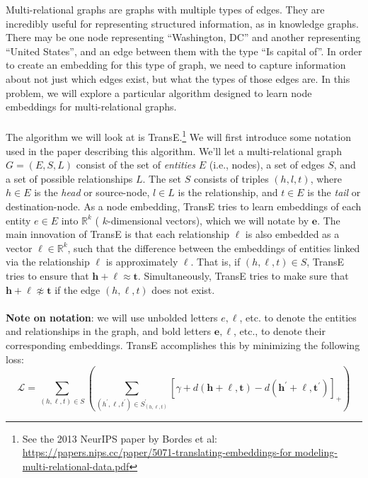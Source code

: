 \noindent Multi-relational graphs are graphs with multiple types of edges. They are incredibly useful for representing structured information, as in knowledge graphs. There may be one node representing “Washington, DC” and another representing “United States”, and an edge between them with the type “Is capital of”. In order to create an embedding for this type of graph, we need to capture information about not just which edges exist, but what the types of those edges are. In this problem, we will explore a particular algorithm designed to learn node embeddings for multi-relational graphs. \\\\
The algorithm we will look at is TransE.\footnote{See the 2013 NeurIPS paper by Bordes et al: \url{https://papers.nips.cc/paper/5071-translating-embeddings-for modeling-multi-relational-data.pdf}}
We will first introduce some notation used in the paper describing this algorithm.
We’ll let a multi-relational graph $G = (E, S, L)$ consist of the set of \textit{entities} $E$ (i.e., nodes), a set of edges $S$, and a set of possible relationships $L$.
The set $S$ consists of triples $(h, l, t)$, where $h \in E$ is the \textit{head} or source-node, $l \in L$ is the relationship, and $t \in E$ is the \textit{tail} or destination-node.
As a node embedding, TransE tries to learn embeddings of each entity $e \in E$ into $\mathbb{R}^k$ ( $k$-dimensional vectors), which we will notate by $\mathbf{e}$. The main innovation of TransE is that each relationship $\ell$ is also embedded as a vector $\ell \in \mathbb{R}^k$, such that the difference between the embeddings of entities linked via the relationship $\ell$ is approximately $\ell$. That is, if $(h, \ell, t) \in S$, TransE tries to ensure that $\mathbf{h}+\boldsymbol{\ell} \approx \mathbf{t}$. Simultaneously, TransE tries to make sure that $\mathbf{h}+\boldsymbol{\ell} \not\approx \mathbf{t}$ if the edge $(h, \ell, t)$ does not exist.\\\\
\textbf{Note on notation}: we will use unbolded letters $e, \ell$, etc. to denote the entities and relationships in the graph, and bold letters $\mathbf{e}, \boldsymbol{\ell}$, etc., to denote their corresponding embeddings.
TransE accomplishes this by minimizing the following loss:
\begin{equation}\label{eq1}
\mathcal{L}=\sum_{(h, \ell, t) \in S}\left(\sum_{\left(h^{\prime}, \ell, t^{\prime}\right) \in S_{(h, \ell, t)}^{\prime}}\left[\gamma+d(\mathbf{h}+\boldsymbol{\ell}, \mathbf{t})-d\left(\mathbf{h}^{\prime}+\boldsymbol{\ell}, \mathbf{t}^{\prime}\right)\right]_{+}\right)
\end{equation}

